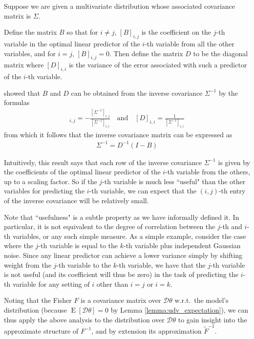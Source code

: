 \documentclass[12pt]{article}
\newcommand{\expected}{\operatorname{E}}
\newcommand{\deriv}{\mathcal{D}}
\begin{document}
Suppose we are given a multivariate distribution whose associated covariance matrix is $\Sigma$.

Define the matrix $B$ so that for $i \neq j$, $[B]_{i,j}$ is the coefficient on the $j$-th variable in the optimal linear predictor of the $i$-th variable from all the other variables, and for $i = j$, $[B]_{i,j} = 0$.  Then define the matrix $D$ to be the diagonal matrix where $[D]_{i,i}$ is the variance of the error associated with such a predictor of the $i$-th variable.

\citet{pourahmadi_new} showed that $B$ and $D$ can be obtained from the inverse covariance $\Sigma^{-1}$ by the formulas
\begin{align*}
[B]_{i,j} = -\frac{[\Sigma^{-1}]_{i,j}}{[\Sigma^{-1}]_{i,i}} \quad \mbox{and} \quad [D]_{i,i} = \frac{1}{[\Sigma^{-1}]_{i,i}}
\end{align*}
from which it follows that the inverse covariance matrix can be expressed as
\begin{align*}
\Sigma^{-1} = D^{-1} (I - B)
\end{align*}

Intuitively, this result says that each row of the inverse covariance $\Sigma^{-1}$ is given by the coefficients of the optimal linear predictor of the $i$-th variable from the others, up to a scaling factor.  So if the $j$-th variable is much less ``useful" than the other variables for predicting the $i$-th variable, we can expect that the $(i,j)$-th entry of the inverse covariance will be relatively small.  

Note that ``usefulness" is a subtle property as we have informally defined it.  In particular, it is not equivalent to the degree of correlation between the $j$-th and $i$-th variables, or any such simple measure.  As a simple example, consider the case where the $j$-th variable is equal to the $k$-th variable plus independent Gaussian noise.  Since any linear predictor can achieve a lower variance simply by shifting weight from the $j$-th variable to the $k$-th variable, we have that the $j$-th variable is not useful (and its coefficient will thus be zero) in the task of predicting the $i$-th variable for any setting of $i$ other than $i = j$ or $i = k$.

Noting that the Fisher $F$ is a covariance matrix over $\deriv \theta$ w.r.t.~the model's distribution (because $\expected[ \deriv \theta ] = 0$ by Lemma \ref{lemma:udv_expectation}), we can thus apply the above analysis to the distribution over $\deriv \theta$ to gain insight into the approximate structure of $F^{-1}$, and by extension its approximation $\tilde{F}^{-1}$.
\end{document}
